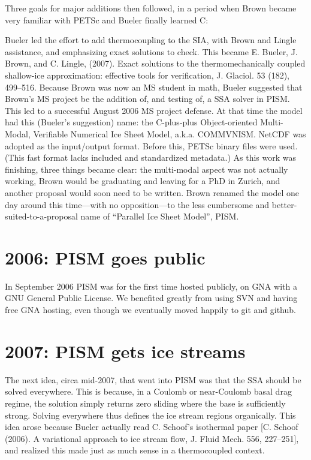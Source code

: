 \documentclass[11pt]{article}
\begin{document}
Three goals for major additions then followed, in a period when Brown became very familiar with PETSc and Bueler finally learned C:

Bueler led the effort to add thermocoupling to the SIA, with Brown and Lingle assistance, and emphasizing exact solutions to check. This became E. Bueler, J. Brown, and C. Lingle, (2007). Exact solutions to the thermomechanically coupled shallow-ice approximation: effective tools for verification, J. Glaciol. 53 (182), 499–516.
Because Brown was now an MS student in math, Bueler suggested that Brown's MS project be the addition of, and testing of, a SSA solver in PISM. This led to a successful August 2006 MS project defense. At that time the model had this (Bueler's suggestion) name: the C-plus-plus Object-oriented Multi-Modal, Verifiable Numerical Ice Sheet Model, a.k.a. COMMVNISM.
NetCDF was adopted as the input/output format. Before this, PETSc binary files were used. (This fast format lacks included and standardized metadata.)
As this work was finishing, three things became clear: the multi-modal aspect was not actually working, Brown would be graduating and leaving for a PhD in Zurich, and another proposal would soon need to be written. Brown renamed the model one day around this time—with no opposition—to the less cumbersome and better-suited-to-a-proposal name of “Parallel Ice Sheet Model”, PISM.

\section*{2006: PISM goes public}

In September 2006 PISM was for the first time hosted publicly, on GNA with a GNU General Public License. We benefited greatly from using SVN and having free GNA hosting, even though we eventually moved happily to git and github.

\section*{2007: PISM gets ice streams}

The next idea, circa mid-2007, that went into PISM was that the SSA should be solved everywhere. This is because, in a Coulomb or near-Coulomb basal drag regime, the solution simply returns zero sliding where the base is sufficiently strong. Solving everywhere thus defines the ice stream regions organically. This idea arose because Bueler actually read C. Schoof's isothermal paper [C. Schoof (2006). A variational approach to ice stream flow, J. Fluid Mech. 556, 227–251], and realized this made just as much sense in a thermocoupled context.
\end{document}
